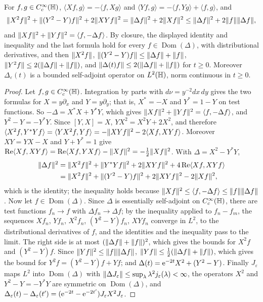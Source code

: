 \begin{lemma}\label{lem:ell}
For $f,g\in C_c^\infty(\mathbb{H})$,
$\langle Xf,g\rangle=-\langle f,Xg\rangle$ and $\langle Yf,g\rangle=-\langle f,Yg\rangle+\langle f,g\rangle$, and
\[
\lVert X^2f\rVert^2+\lVert (Y^2-Y)f\rVert^2+2\lVert XYf\rVert^2=\lVert \Delta f\rVert^2+2\lVert Xf\rVert^2\le\lVert \Delta f\rVert^2+2\lVert f\rVert\lVert \Delta f\rVert,
\]
and $\lVert Xf\rVert^2+\lVert Yf\rVert^2=\langle f,-\Delta f\rangle$. By closure, the displayed identity and inequality and the last
formula hold for every $f\in\operatorname{Dom}(\Delta)$, with distributional derivatives, and then $\lVert X^2f\rVert$, $\lVert (Y^2-Y)f\rVert\le\lVert \Delta f\rVert+\lVert f\rVert$,
$\lVert Y^2f\rVert\le2(\lVert \Delta f\rVert+\lVert f\rVert)$, and
$\lVert \Delta(t)f\rVert\le2(\lVert \Delta f\rVert+\lVert f\rVert)$ for $t\ge0$. Moreover
$\Delta_\varepsilon(t)$ is a bounded self-adjoint operator on $L^2(\mathbb{H})$, norm continuous in $t\ge0$.
\end{lemma}
\begin{proof}
Let $f,g\in C_c^\infty(\mathbb{H})$. Integration by parts with $d\nu=y^{-2}dx\,dy$ gives the two formulas for $X=y\partial_x$ and $Y=y\partial_y$;
that is, $X^*=-X$ and $Y^*=1-Y$ on test functions. So $-\Delta=X^*X+Y^*Y$, which gives
$\lVert Xf\rVert^2+\lVert Yf\rVert^2=\langle f,-\Delta f\rangle$, and
$Y^2-Y=-Y^*Y$. Since $[Y,X]=X$, $YX^2=X^2Y+2X^2$, and therefore
$\langle X^2f,Y^*Yf\rangle=\langle YX^2f,Yf\rangle=-\lVert XYf\rVert^2-2\langle Xf,XYf\rangle$. Moreover $XY=YX-X$ and $Y+Y^*=1$ give
$\mathrm{Re}\langle Xf,XYf\rangle=\mathrm{Re}\langle Xf,YXf\rangle-\lVert Xf\rVert^2=-\tfrac12\lVert Xf\rVert^2$. With $\Delta=X^2-Y^*Y$,
\begin{align*}
\lVert \Delta f\rVert^2&=\lVert X^2f\rVert^2+\lVert Y^*Yf\rVert^2+2\lVert XYf\rVert^2+4\,\mathrm{Re}\langle Xf,XYf\rangle\\
&=\lVert X^2f\rVert^2+\lVert (Y^2-Y)f\rVert^2+2\lVert XYf\rVert^2-2\lVert Xf\rVert^2,
\end{align*}
which is the identity; the inequality holds because $\lVert Xf\rVert^2\le\langle f,-\Delta f\rangle\le\lVert f\rVert\lVert \Delta f\rVert$. Now let
$f\in\operatorname{Dom}(\Delta)$. Since $\Delta$ is essentially self-adjoint on $C_c^\infty(\mathbb{H})$, there are test functions $f_n\to f$ with
$\Delta f_n\to\Delta f$; by the inequality applied to $f_n-f_m$, the sequences $Xf_n$, $Yf_n$, $X^2f_n$, $(Y^2-Y)f_n$, $XYf_n$ converge in
$L^2$, to the distributional derivatives of $f$, and the identities and the inequality pass to the limit. The right side is at most
$(\lVert \Delta f\rVert+\lVert f\rVert)^2$, which gives the bounds for $X^2f$ and $(Y^2-Y)f$. Since $\lVert Yf\rVert^2\le\lVert f\rVert\lVert \Delta f\rVert$,
$\lVert Yf\rVert\le\tfrac12(\lVert \Delta f\rVert+\lVert f\rVert)$, which gives the bound for $Y^2f=(Y^2-Y)f+Yf$; and $\Delta(t)=\mathrm{e}^{-2t}X^2+(Y^2-Y)$.
Finally $J_\varepsilon$ maps $L^2$ into $\operatorname{Dom}(\Delta)$ with
$\lVert \Delta J_\varepsilon\rVert\le\sup_\lambda\lambda^2j_\varepsilon(\lambda)<\infty$, the operators $X^2$ and $Y^2-Y=-Y^*Y$ are symmetric on
$\operatorname{Dom}(\Delta)$, and $\Delta_\varepsilon(t)-\Delta_\varepsilon(t')=(\mathrm{e}^{-2t}-\mathrm{e}^{-2t'})J_\varepsilon X^2J_\varepsilon$.
\end{proof}

